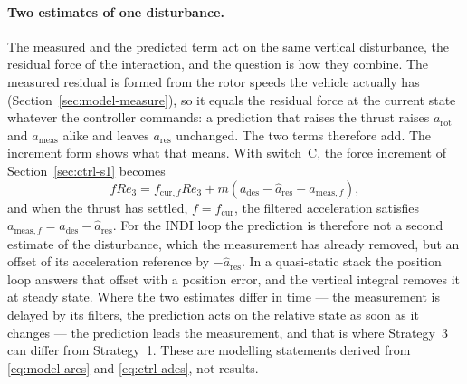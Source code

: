 \paragraph{Two estimates of one disturbance.} The measured and the predicted term act on the same
vertical disturbance, the residual force of the interaction, and the question is how they combine.
The measured residual is formed from the rotor speeds the vehicle actually has
(Section~\ref{sec:model-measure}), so it equals the residual force at the current state whatever
the controller commands: a prediction that raises the thrust raises $a_{\mathrm{rot}}$ and
$a_{\mathrm{meas}}$ alike and leaves $a_{\mathrm{res}}$ unchanged. The two terms therefore add.
The increment form shows what that means. With switch~C, the force increment of
Section~\ref{sec:ctrl-s1} becomes
\begin{equation}
  f R e_3 = f_{\mathrm{cur},f} R e_3 + m\left(a_{\mathrm{des}} - \hat a_{\mathrm{res}} - a_{\mathrm{meas},f}\right),
  \label{eq:ctrl-s3-increment}
\end{equation}
and when the thrust has settled, $f = f_{\mathrm{cur}}$, the filtered acceleration satisfies
$a_{\mathrm{meas},f} = a_{\mathrm{des}} - \hat a_{\mathrm{res}}$. For the INDI loop the prediction is
therefore not a second estimate of the disturbance, which the measurement has already removed, but
an offset of its acceleration reference by $-\hat a_{\mathrm{res}}$. In a quasi-static stack the
position loop answers that offset with a position error, and the vertical integral removes it at
steady state. Where the two estimates differ in time --- the measurement is delayed by its filters,
the prediction acts on the relative state as soon as it changes --- the prediction leads the
measurement, and that is where Strategy~3 can differ from Strategy~1. These are modelling
statements derived from \eqref{eq:model-ares} and \eqref{eq:ctrl-ades}, not results.


